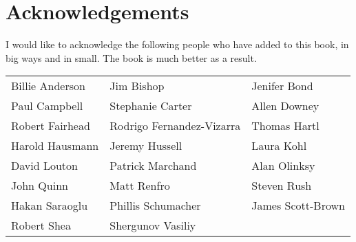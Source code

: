 
    \chapter*{Acknowledgements}
    \thispagestyle{empty}

    I would like to acknowledge the following people who have added to this book, in big ways and in small.  The book is much better as a result. 

    \vspace{.5in}

    \begin{doublespace}
    \begin{tabular}{p{2in}p{2in}p{2in}}
    Billie Anderson&Jim Bishop&Jenifer Bond\\
Paul Campbell&Stephanie Carter&Allen Downey\\
Robert Fairhead&Rodrigo Fernandez-Vizarra&Thomas Hartl\\
Harold Hausmann&Jeremy Hussell&Laura Kohl\\
David Louton&Patrick Marchand&Alan Olinksy\\
John Quinn&Matt Renfro&Steven Rush\\
Hakan Saraoglu&Phillis Schumacher&James Scott-Brown\\
Robert Shea&Shergunov Vasiliy&
     \end{tabular}
    \end{doublespace}
    